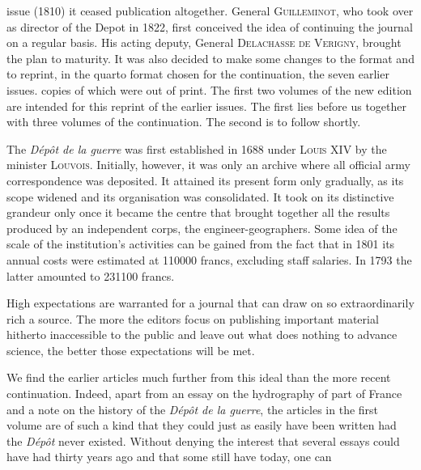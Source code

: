 %
issue (1810) it ceased publication altogether. General \textsc{Guilleminot}, who took over as director of the Depot in 1822, first conceived the idea of continuing the journal on a regular basis. His acting deputy, General \textsc{Delachasse de Verigny}, brought the plan to maturity. It was also decided to make some changes to the format and to reprint, in the quarto format chosen for the continuation, the seven earlier issues. copies of which were out of print. The first two volumes of the new edition are intended for this reprint of the earlier issues. The first lies before us together with three volumes of the continuation. The second is to follow shortly.

The \textit{Dépôt de la guerre} was first established in 1688 under \textsc{Louis} XIV by the minister \textsc{Louvois}. Initially, however, it was only an archive where all official army correspondence was deposited. It attained its present form only gradually, as its scope widened and its organisation was consolidated. It took on its distinctive grandeur only once it became the centre that brought together all the results produced by an independent corps, the engineer-geographers. Some idea of the scale of the institution's activities can be gained from the fact that in 1801 its annual costs were estimated at 110000 francs, excluding staff salaries. In 1793 the latter amounted to 231100 francs.

High expectations are warranted for a journal that can draw on so extraordinarily rich a source. The more the editors focus on publishing important material hitherto inaccessible to the public and leave out what does nothing to advance science, the better those expectations will be met.

We find the earlier articles much further from this ideal than the more recent continuation. Indeed, apart from an essay on the hydrography of part of France and a note on the history of the \textit{Dépôt de la guerre}, the articles in the first volume are of such a kind that they could just as easily have been written had the \textit{Dépôt} never existed. Without denying the interest that several essays could have had thirty years ago and that some still have today, one can
